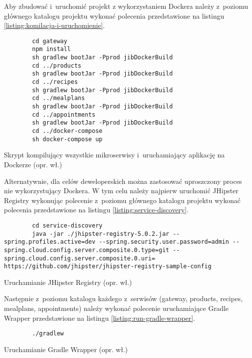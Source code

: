 Aby zbudować i~uruchomić projekt z wykorzystaniem Dockera należy z~poziomu głównego katalogu projektu
wykonać polecenia przedstawione na listingu \ref{listing:komilacja-i-uruchomienie}.
\begin{listing}[h!]
    \begin{verbatim}
        cd gateway
        npm install
        sh gradlew bootJar -Pprod jibDockerBuild
        cd ../products
        sh gradlew bootJar -Pprod jibDockerBuild
        cd ../recipes
        sh gradlew bootJar -Pprod jibDockerBuild
        cd ../mealplans
        sh gradlew bootJar -Pprod jibDockerBuild
        cd ../appointments
        sh gradlew bootJar -Pprod jibDockerBuild
        cd ../docker-compose
        sh docker-compose up
    \end{verbatim}
    \centering\caption{Skrypt kompilujący wszystkie mikroserwisy i~uruchamiający aplikację na Dockerze (opr. wł.)}\label{listing:komilacja-i-uruchomienie}
\end{listing}

Alternatywnie, dla celów deweloperskich można zastosować uproszczony proces nie wykorzystujący Dockera.
W tym celu należy najpierw uruchomić JHipster Registry wykonując polecenie z~poziomu głównego katalogu projektu
wykonać polecenia przedstawione na listingu \ref{listing:service-discovery}.
\begin{listing}[h!]
    \begin{verbatim}
        cd service-discovery
        java -jar ./jhipster-registry-5.0.2.jar --spring.profiles.active=dev --spring.security.user.password=admin --spring.cloud.config.server.composite.0.type=git --spring.cloud.config.server.composite.0.uri= https://github.com/jhipster/jhipster-registry-sample-config
    \end{verbatim}
    \centering\caption{Uruchamianie JHipster Registry (opr. wł.)}\label{listing:service-discovery}
\end{listing}

Następnie z~poziomu katalogu każdego z~serwisów (gateway, products, recipes, mealplans, appointments)
należy wykonać polecenie uruchamiające Gradle Wrapper przedstawione na listingu \ref{listing:run-gradle-wrapper}.
\begin{listing}[h!]
    \begin{verbatim}
        ./gradlew
    \end{verbatim}
    \centering\caption{Uruchamianie Gradle Wrapper (opr. wł.)}\label{listing:run-gradle-wrapper}
\end{listing}

